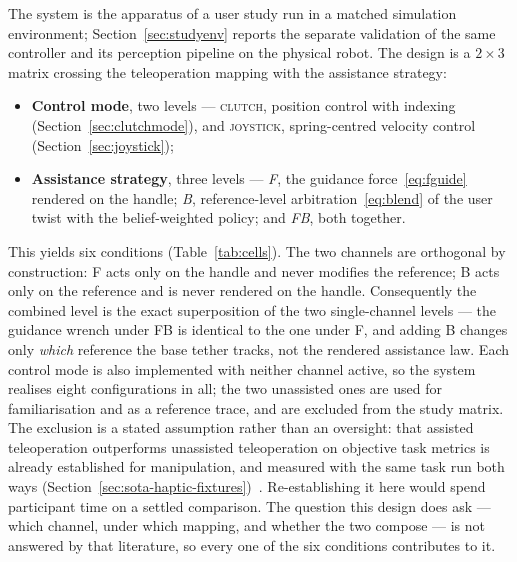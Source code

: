 \documentclass[12pt,a4paper,twoside,openright]{report}
\begin{document}
The system is the apparatus of a user study run in a matched simulation environment; Section~\ref{sec:studyenv} reports the separate validation of the same controller and its perception pipeline on the physical robot. The design is a $2\times3$ matrix crossing the teleoperation mapping with the assistance strategy:
\begin{itemize}[nosep]
\item \textbf{Control mode}, two levels --- \textsc{clutch}, position control with indexing (Section~\ref{sec:clutchmode}), and \textsc{joystick}, spring-centred velocity control (Section~\ref{sec:joystick});
\item \textbf{Assistance strategy}, three levels --- \emph{F}, the guidance force~\eqref{eq:fguide} rendered on the handle; \emph{B}, reference-level arbitration~\eqref{eq:blend} of the user twist with the belief-weighted policy; and \emph{FB}, both together.
\end{itemize}
This yields six conditions (Table~\ref{tab:cells}). The two channels are orthogonal by construction: F acts only on the handle and never modifies the reference; B acts only on the reference and is never rendered on the handle. Consequently the combined level is the exact superposition of the two single-channel levels --- the guidance wrench under FB is identical to the one under F, and adding B changes only \emph{which} reference the base tether tracks, not the rendered assistance law. Each control mode is also implemented with neither channel active, so the system realises eight configurations in all; the two unassisted ones are used for familiarisation and as a reference trace, and are excluded from the study matrix. The exclusion is a stated assumption rather than an oversight: that assisted teleoperation outperforms unassisted teleoperation on objective task metrics is already established for manipulation, and measured with the same task run both ways (Section~\ref{sec:sota-haptic-fixtures})~\cite{bettini2004vision}. Re-establishing it here would spend participant time on a settled comparison. The question this design does ask --- which channel, under which mapping, and whether the two compose --- is not answered by that literature, so every one of the six conditions contributes to it.
\end{document}

